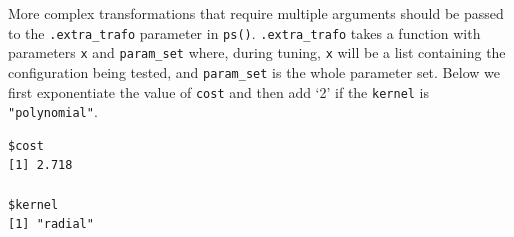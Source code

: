More complex transformations that require multiple arguments should be
passed to the \texttt{.extra\_trafo} parameter in \texttt{ps()}.
\texttt{.extra\_trafo} takes a function with parameters \texttt{x} and
\texttt{param\_set} where, during tuning, \texttt{x} will be a list
containing the configuration being tested, and \texttt{param\_set} is
the whole parameter set. Below we first exponentiate the value of
\texttt{cost} and then add `2' if the \texttt{kernel} is
\texttt{"polynomial"}.

\begin{Shaded}
\begin{Highlighting}[]
\OtherTok{=} \NormalTok{(}
   \NormalTok{(}\SpecialCharTok{{-}}\NormalTok{, }\NormalTok{, } 
   \NormalTok{(}\NormalTok{(}\NormalTok{, }\NormalTok{)),}
   
    \SpecialCharTok{$}\SpecialCharTok{==} \NormalTok{) \{}
\SpecialCharTok{$}\OtherTok{=}\SpecialCharTok{$}\SpecialCharTok{+} 
\NormalTok{    \}}
\NormalTok{  \}}
\NormalTok{)}
\SpecialCharTok{$}\NormalTok{(}\NormalTok{(} \NormalTok{, } \NormalTok{))}
\end{Highlighting}
\end{Shaded}

\begin{verbatim}
$cost
[1] 2.718

$kernel
[1] "radial"
\end{verbatim}

\begin{Shaded}
\begin{Highlighting}[]
\SpecialCharTok{$}\NormalTok{(}\NormalTok{(} \NormalTok{, } \NormalTok{))}
\end{Highlighting}
\end{Shaded}

